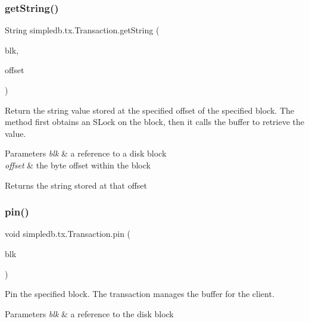 \subsubsection{\texorpdfstring{get\+String()}{getString()}}
{\footnotesize\ttfamily String simpledb.\+tx.\+Transaction.\+get\+String (\begin{DoxyParamCaption}\item[{\hyperlink{classsimpledb_1_1file_1_1BlockId}{Block\+Id}}]{blk,  }\item[{int}]{offset }\end{DoxyParamCaption})\hspace{0.3cm}{\ttfamily [inline]}}

Return the string value stored at the specified offset of the specified block. The method first obtains an S\+Lock on the block, then it calls the buffer to retrieve the value. 
\begin{DoxyParams}{Parameters}
{\em blk} & a reference to a disk block \\
\hline
{\em offset} & the byte offset within the block \\
\hline
\end{DoxyParams}
\begin{DoxyReturn}{Returns}
the string stored at that offset 
\end{DoxyReturn}
\mbox{\label{classsimpledb_1_1tx_1_1Transaction_a782c86ca857e897c9886bec8269b4c74}} 
\subsubsection{\texorpdfstring{pin()}{pin()}}
{\footnotesize\ttfamily void simpledb.\+tx.\+Transaction.\+pin (\begin{DoxyParamCaption}\item[{\hyperlink{classsimpledb_1_1file_1_1BlockId}{Block\+Id}}]{blk }\end{DoxyParamCaption})\hspace{0.3cm}{\ttfamily [inline]}}

Pin the specified block. The transaction manages the buffer for the client. 
\begin{DoxyParams}{Parameters}
{\em blk} & a reference to the disk block \\
\hline
\end{DoxyParams}
\mbox{\label{classsimpledb_1_1tx_1_1Transaction_a857670b0a879033a797cbe5658463db1}} 
